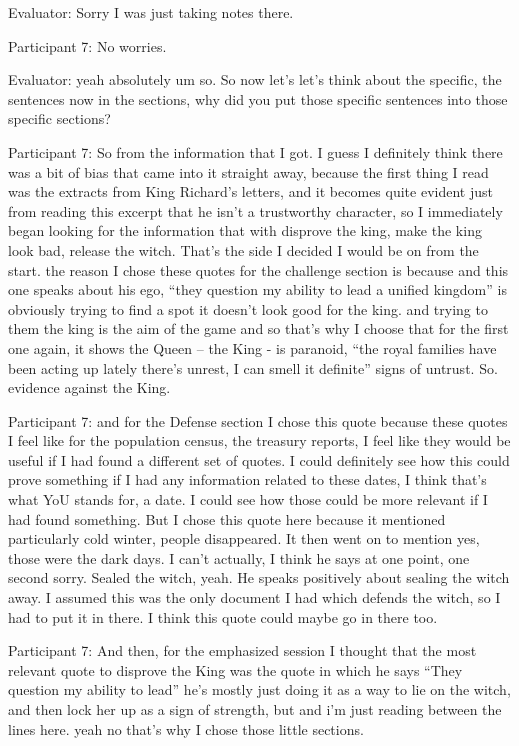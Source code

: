 \documentclass{l4proj}
\begin{document}
\begin{appendices}
Evaluator: Sorry I was just taking notes there.

Participant 7: No worries.

Evaluator: yeah absolutely um so. So now let's let's think about the specific, the sentences now in the sections, why did you put those specific sentences into those specific sections?

 

Participant 7: So from the information that I got. I guess I definitely think there was a bit of bias that came into it straight away, because the first thing I read was the extracts from King Richard’s letters, and it becomes quite evident just from reading this excerpt that he isn't a trustworthy character, so I immediately began looking for the information that with disprove the king, make the king look bad, release the witch. That’s the side I decided I would be on from the start. the reason I chose these quotes for the challenge section is because and this one speaks about his ego, “they question my ability to lead a unified kingdom” is obviously trying to find a spot it doesn't look good for the king. and trying to them the king is the aim of the game and so that's why I choose that for the first one again, it shows the Queen – the King - is paranoid, “the royal families have been acting up lately there's unrest, I can smell it definite” signs of untrust. So. evidence against the King.

 

Participant 7: and for the Defense section I chose this quote because these quotes I feel like for the population census, the treasury reports, I feel like they would be useful if I had found a different set of quotes. I could definitely see how this could prove something if I had any information related to these dates, I think that’s what YoU stands for, a date. I could see how those could be more relevant if I had found something. But I chose this quote here because it mentioned particularly cold winter, people disappeared. It then went on to mention yes, those were the dark days. I can’t actually, I think he says at one point, one second sorry. Sealed the witch, yeah. He speaks positively about sealing the witch away. I assumed this was the only document I had which defends the witch, so I had to put it in there. I think this quote could maybe go in there too. 
 

Participant 7: And then, for the emphasized session I thought that the most relevant quote to disprove the King was the quote in which he says “They question my ability to lead” he’s mostly just doing it as a way to lie on the witch, and then lock her up as a sign of strength, but and i'm just reading between the lines here. yeah no that's why I chose those little sections.
 


\end{appendices}
\end{document}
